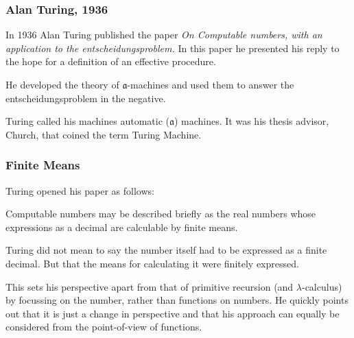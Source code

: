 \documentclass{beamer}
\begin{document}
\begin{frame}
  \frametitle{Alan Turing, 1936}

	In 1936 Alan Turing published the paper \emph{On Computable numbers, with an application to the entscheidungsproblem.} In this paper he presented his reply to the hope for a definition of an effective procedure.

	\vspace{0.5cm}

	He developed the theory of $\mathfrak{a}$-machines and used them to answer the entscheidungsproblem in the negative. 

	\vspace{0.5cm}

	Turing called his machines automatic ($\mathfrak{a}$) machines. It was his thesis advisor, Church, that coined the term Turing Machine. 



\end{frame}

\begin{frame}
	\frametitle{Finite Means}

	Turing opened his paper as follows: 

	\begin{displayquote}
		Computable numbers may be described briefly as the real numbers whose expressions as a decimal are calculable by finite means. 
	\end{displayquote}
	
	Turing did not mean to say the number itself had to be expressed as a finite decimal. But that the means for calculating it were finitely expressed. 

	\vspace{0.5cm}

	This sets his perspective apart from that of primitive recursion (and $\lambda$-calculus) by focussing on the number, rather than functions on numbers. He quickly points out that it is just a change in perspective and that his approach can equally be considered from the point-of-view of functions. 

\end{frame}
\end{document}

